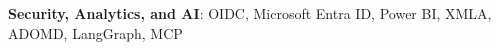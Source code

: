 \item{\textbf{Security, Analytics, and AI}{: OIDC, Microsoft Entra ID, Power BI, XMLA, ADOMD, LangGraph, MCP}}
